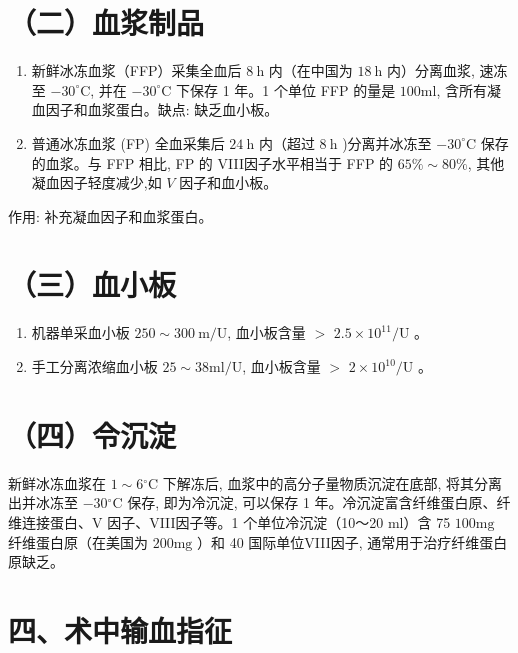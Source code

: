 \documentclass[10pt]{article}
\begin{document}
\section*{（二）血浆制品}
\begin{enumerate}
  \item 新鲜冰冻血浆（FFP）采集全血后 $8 \mathrm{~h}$ 内（在中国为 $18 \mathrm{~h}$ 内）分离血浆, 速冻至 $-30^{\circ} \mathrm{C}$, 并在 $-30^{\circ} \mathrm{C}$ 下保存 1 年。1 个单位 FFP 的量是 $100 \mathrm{ml}$, 含所有凝血因子和血浆蛋白。缺点: 缺乏血小板。

  \item 普通冰冻血浆 (FP) 全血采集后 $24 \mathrm{~h}$ 内（超过 $8 \mathrm{~h}$ )分离并冰冻至 $-30^{\circ} \mathrm{C}$ 保存的血浆。与 FFP 相比, FP 的 VIII因子水平相当于 FFP 的 $65 \% \sim 80 \%$, 其他凝血因子轻度减少,如 $V$ 因子和血小板。

\end{enumerate}

作用: 补充凝血因子和血浆蛋白。

\section*{（三）血小板}
\begin{enumerate}
  \item 机器单采血小板 $250 \sim 300 \mathrm{~m} / \mathrm{U}$, 血小板含量 $>$ $2.5 \times 10^{11} / \mathrm{U}$ 。

  \item 手工分离浓缩血小板 $25 \sim 38 \mathrm{ml} / \mathrm{U}$, 血小板含量 $>$ $2 \times 10^{10} / \mathrm{U}$ 。

\end{enumerate}

\section*{（四）令沉淀}
新鲜冰冻血浆在 $1 \sim 6{ }^{\circ} \mathrm{C}$ 下解冻后, 血浆中的高分子量物质沉淀在底部, 将其分离出并冰冻至 $-30{ }^{\circ} \mathrm{C}$ 保存, 即为冷沉淀, 可以保存 1 年。冷沉淀富含纤维蛋白原、纤维连接蛋白、V 因子、VIII因子等。1 个单位冷沉淀（10～20 ml）含 75 $100 \mathrm{mg}$ 纤维蛋白原（在美国为 $200 \mathrm{mg}$ ）和 40 国际单位VIII因子, 通常用于治疗纤维蛋白原缺乏。

\section*{四、术中输血指征}
\end{document}
